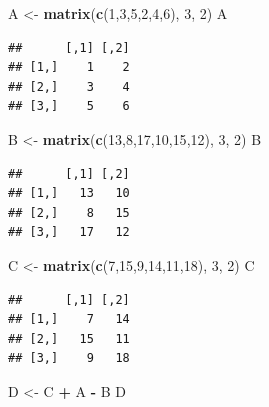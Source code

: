 \documentclass[
]{book}
\newenvironment{Shaded}{\begin{snugshade}}{\end{snugshade}}
\newcommand{\DecValTok}[1]{\textcolor[rgb]{0.00,0.00,0.81}{#1}}
\newcommand{\FunctionTok}[1]{\textcolor[rgb]{0.13,0.29,0.53}{\textbf{#1}}}
\newcommand{\NormalTok}[1]{#1}
\newcommand{\OtherTok}[1]{\textcolor[rgb]{0.56,0.35,0.01}{#1}}
\newcommand{\SpecialCharTok}[1]{\textcolor[rgb]{0.81,0.36,0.00}{\textbf{#1}}}
\begin{document}
\begin{Shaded}
\begin{Highlighting}[]
\NormalTok{ A }\OtherTok{\textless{}{-}} \FunctionTok{matrix}\NormalTok{(}\FunctionTok{c}\NormalTok{(}\DecValTok{1}\NormalTok{,}\DecValTok{3}\NormalTok{,}\DecValTok{5}\NormalTok{,}\DecValTok{2}\NormalTok{,}\DecValTok{4}\NormalTok{,}\DecValTok{6}\NormalTok{), }\DecValTok{3}\NormalTok{, }\DecValTok{2}\NormalTok{) }
\NormalTok{ A }
\end{Highlighting}
\end{Shaded}

\begin{verbatim}
##      [,1] [,2]
## [1,]    1    2
## [2,]    3    4
## [3,]    5    6
\end{verbatim}

\begin{Shaded}
\begin{Highlighting}[]
\NormalTok{ B }\OtherTok{\textless{}{-}} \FunctionTok{matrix}\NormalTok{(}\FunctionTok{c}\NormalTok{(}\DecValTok{13}\NormalTok{,}\DecValTok{8}\NormalTok{,}\DecValTok{17}\NormalTok{,}\DecValTok{10}\NormalTok{,}\DecValTok{15}\NormalTok{,}\DecValTok{12}\NormalTok{), }\DecValTok{3}\NormalTok{, }\DecValTok{2}\NormalTok{) }
\NormalTok{ B }
\end{Highlighting}
\end{Shaded}

\begin{verbatim}
##      [,1] [,2]
## [1,]   13   10
## [2,]    8   15
## [3,]   17   12
\end{verbatim}

\begin{Shaded}
\begin{Highlighting}[]
\NormalTok{ C }\OtherTok{\textless{}{-}} \FunctionTok{matrix}\NormalTok{(}\FunctionTok{c}\NormalTok{(}\DecValTok{7}\NormalTok{,}\DecValTok{15}\NormalTok{,}\DecValTok{9}\NormalTok{,}\DecValTok{14}\NormalTok{,}\DecValTok{11}\NormalTok{,}\DecValTok{18}\NormalTok{), }\DecValTok{3}\NormalTok{, }\DecValTok{2}\NormalTok{) }
\NormalTok{ C }
\end{Highlighting}
\end{Shaded}

\begin{verbatim}
##      [,1] [,2]
## [1,]    7   14
## [2,]   15   11
## [3,]    9   18
\end{verbatim}

\begin{Shaded}
\begin{Highlighting}[]
\NormalTok{ D }\OtherTok{\textless{}{-}}\NormalTok{ C }\SpecialCharTok{+}\NormalTok{ A }\SpecialCharTok{{-}}\NormalTok{ B }
\NormalTok{ D }
\end{Highlighting}
\end{Shaded}
\end{document}
